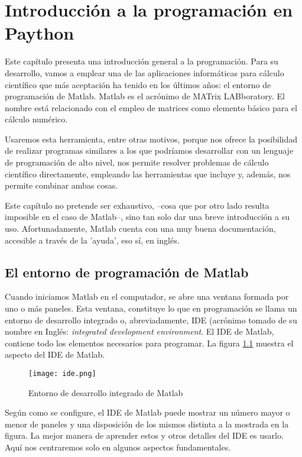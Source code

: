 \chapter{Introducción a la programación en Paython} 
Este capítulo presenta una introducción general a la programación. Para su desarrollo, vamos a emplear una de las aplicaciones informáticas para cálculo científico que más aceptación ha tenido en los últimos años: el entorno de programación de Matlab. Matlab es el acrónimo de MATrix LABboratory. El nombre está relacionado con el empleo de matrices como elemento básico para el cálculo numérico.

Usaremos esta herramienta, entre otras motivos, porque nos ofrece la posibilidad de realizar programas similares a los que podríamos desarrollar con un lenguaje de programación de alto nivel, nos permite resolver problemas de cálculo científico directamente, empleando las herramientas que incluye y, además, nos permite combinar ambas cosas.

Este capítulo no pretende ser exhaustivo, --cosa que por otro lado resulta imposible en el caso de Matlab--, sino tan solo dar una breve introducción a su uso. Afortunadamente, Matlab cuenta con una muy buena documentación, accesible a través de la 'ayuda', eso sí, en inglés. 



\section{El entorno de programación de Matlab}
Cuando iniciamos Matlab en el computador, se abre una ventana formada por uno o más paneles. Esta ventana, constituye lo que en programación se  llama un entorno de desarrollo integrado o, abreviadamente, IDE (acrónimo tomado de su nombre en Inglés: \emph{integrated development environment}. El IDE de Matlab, contiene todo los elementos necesarios para programar. La figura \ref{fig:ide} muestra el aspecto del IDE de Matlab.

\begin{figure}[h]
	\centering
		\texttt{[image: ide.png]}
	\caption{Entorno de desarrollo integrado de Matlab}
	\label{fig:ide}
\end{figure}

Según como se configure, el IDE de Matlab puede mostrar un número mayor o menor de paneles y una disposición de los mismos distinta a la mostrada en la figura. La mejor manera de aprender estos y otros detalles del IDE es usarlo. Aquí nos centraremos solo en algunos aspectos fundamentales.

